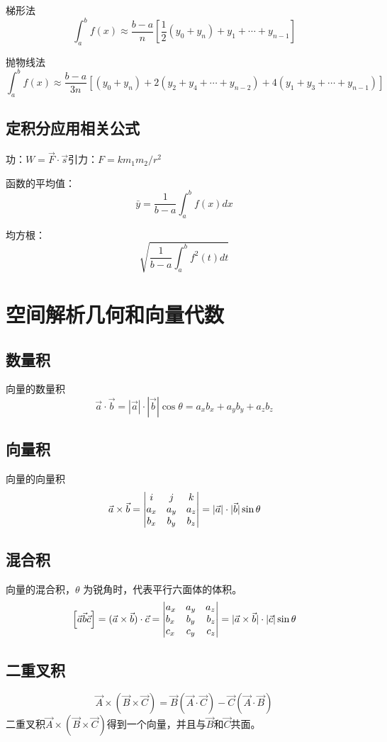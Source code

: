 梯形法
\[
\int_{a}^{b} f(x) \approx \frac{b-a}{n}\left[\frac{1}{2}\left(y_{0}+y_{n}\right)+y_{1}+\cdots+y_{n-1}\right]
\]

抛物线法
\[
\int_{a}^{b} f(x) \approx \frac{b-a}{3 n}\left[\left(y_{0}+y_{n}\right)+2\left(y_{2}+y_{4}+\cdots+y_{n-2}\right)+4\left(y_{1}+y_{3}+\cdots+y_{n-1}\right)\right]
\]
\subsection{定积分应用相关公式}
功：$W=\vec{F}\cdot\vec{s}$\quad 引力：$F=k{m_1m_2}/{r^2}$

函数的平均值：\[\bar{y}=\frac{1}{b-a}\int_a^bf(x)dx\]

均方根：\[\sqrt{\frac{1}{b-a}\int_a^b f^2(t)dt}\]
\section{空间解析几何和向量代数}
\subsection{数量积}
向量的数量积\[\vec{a}\cdot\vec{b}=|\vec{a}|\cdot|\vec{b}|\cos\theta=
a_xb_x+a_yb_y+a_zb_z\]
\subsection{向量积}
向量的向量积
\[\vec{a}\times\vec{b}=\left|\begin{array}{@{}ccc@{}}
    i&j&k\\
    a_x&a_y&a_z\\
    b_x&b_y&b_z\\
\end{array}\right|=|\vec{a}|\cdot|\vec{b}|\sin\theta\]
\subsection{混合积}
向量的混合积，$\theta$ 为锐角时，代表平行六面体的体积。
\[\left[\vec{a}\vec{b}\vec{c}\right]=(\vec{a}\times\vec{b})\cdot\vec{c}=\left|
\begin{array}{@{}lcr@{}}
    a_x&a_y&a_z\\
    b_x&b_y&b_z\\
    c_x&c_y&c_z\\
\end{array}
\right|=|\vec{a}\times\vec{b}|\cdot|\vec{c}|\sin\theta\]
\subsection{二重叉积}
\[\vec{A}\times(\vec{B}\times\vec{C})=\vec{B}(\vec{A}\cdot\vec{C})-\vec{C}(\vec{A}\cdot\vec{B})\]
二重叉积$\vec{A}\times(\vec{B}\times\vec{C})$得到一个向量，并且与$\vec{B}$和$\vec{C}$共面。
